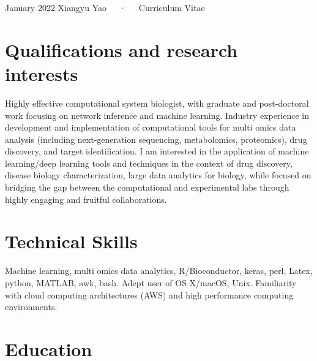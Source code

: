 \documentclass[11pt,a4paper,]{awesome-cv}
\begin{document}
\makecvheader

\makecvfooter
  {January 2022}
    {Xiangyu Yao~~~·~~~Curriculum Vitae}
  {\thepage}





\hypertarget{qualifications-and-research-interests}{%
\section{Qualifications and research
interests}\label{qualifications-and-research-interests}}

Highly effective computational system biologist, with graduate and
post-doctoral work focusing on network inference and machine learning.
Industry experience in development and implementation of computational
tools for multi omics data analysis (including next-generation
sequencing, metabolomics, proteomics), drug discovery, and target
identification. I am interested in the application of machine
learning/deep learning tools and techniques in the context of drug
discovery, disease biology characterization, large data analytics for
biology, while focused on bridging the gap between the computational and
experimental labs through highly engaging and fruitful collaborations.

\hypertarget{technical-skills}{%
\section{Technical Skills}\label{technical-skills}}

Machine learning, multi omics data analytics, R/Bioconductor, keras,
perl, Latex, python, MATLAB, awk, bash. Adept user of OS X/macOS, Unix.
Familiarity with cloud computing architectures (AWS) and high
performance computing environments.

\hypertarget{education}{%
\section{Education}\label{education}}
\end{document}
